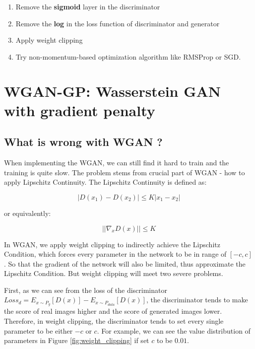 \documentclass{article} %
\begin{document}
\begin{enumerate}
    \item Remove the \textbf{sigmoid} layer in the discriminator
    \item Remove the \textbf{log} in the loss function of discriminator and generator
    \item Apply weight clipping
    \item Try non-momentum-based optimization algorithm like RMSProp or SGD.
\end{enumerate}

\section{WGAN-GP: Wasserstein GAN with gradient penalty}

\subsection{What is wrong with WGAN ?}

When implementing the WGAN, we can still find it hard to train and the training is quite slow. The problem stems from crucial part of WGAN - how to apply Lipschitz Continuity. The Lipschitz Continuity is defined as:

\begin{equation}
    |D(x_1)-D(x_2)| \leq K|x_1-x_2|
\end{equation}

or equivalently:

\begin{equation}
    ||\nabla_x D(x)|| \leq K
\end{equation}

In WGAN, we apply weight clipping to indirectly achieve the Lipschitz Condition, which forces every parameter in the network to be in range of $[-c,c]$. So that the gradient of the network will also be limited, thus approximate the Lipschitz Condition. But weight clipping will meet two severe problems.

First, as we can see from the loss of the discriminator $Loss_d = E_{x \sim P_g}[D(x)]-E_{x \sim P_{data}}[D(x)]$, the discriminator tends to make the score of real images higher and the score of generated images lower. Therefore, in weight clipping, the discriminator tends to set every single parameter to be either $-c$ or $c$. For example, we can see the value distribution of parameters in Figure \ref{fig:weight_clipping} if set $c$ to be $0.01$.
\end{document}
